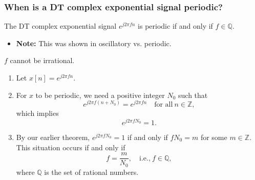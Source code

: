     \subsubsection{When is a DT complex exponential signal periodic?}
    \begin{theorem}
        The DT complex exponential signal \( e^{j 2 \pi f n} \) is periodic if and only if \( f \in \mathbb{Q} \).
        \begin{itemize}
            \item \textbf{Note:} This was shown in oscillatory vs. periodic.
        \end{itemize}
    \end{theorem}

    \begin{warning}
        $f$ cannot be irrational.
    \end{warning}

    \begin{derivation}
        \begin{enumerate}
            \item Let \( x[n] = e^{j 2 \pi f n} \).
            \item For \( x \) to be periodic, we need a positive integer \( N_0 \) such that 
            \[
            e^{j 2 \pi f (n + N_0)} = e^{j 2 \pi f n} \quad \text{for all} \ n \in \mathbb{Z},
            \]
            which implies 
            \[
            e^{j 2 \pi f N_0} = 1.
            \]
            \item By our earlier theorem, \( e^{j 2 \pi f N_0} = 1 \) if and only if \( f N_0 = m \) for some \( m \in \mathbb{Z} \). This situation occurs if and only if 
            \[
            f = \frac{m}{N_0}, \quad \text{i.e.,} \ f \in \mathbb{Q},
            \]
            where \( \mathbb{Q} \) is the set of rational numbers.
        \end{enumerate}        
    \end{derivation}

